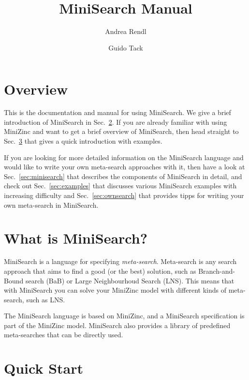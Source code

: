 \documentclass[a4paper,13pt,onecolumn]{article}%
\newcommand{\MiniZinc}{\mbox{\sc MiniZinc}\xspace}
\newcommand{\MiniSearch}{\mbox{\sc MiniSearch}\xspace}
\begin{document}
\title{\MiniSearch Manual}
\author{Andrea Rendl \and Guido Tack}

\maketitle

\tableofcontents

\section{Overview}
This is the documentation and manual for using \MiniSearch. We give
a brief introduction of \MiniSearch in Sec.~\ref{sec:intro}.
If you are already familiar with using \MiniZinc and want to get a brief
overview of \MiniSearch, then head straight to Sec.~\ref{sec:quickStart}
that gives a quick introduction with examples. 

If you are looking for more detailed information on the \MiniSearch
language and would like to write your own meta-search approaches with
it, then have a look at Sec.~\ref{sec:minisearch} that describes the 
components of \MiniSearch in detail, and check out Sec.~\ref{sec:examples}
that discusses various \MiniSearch examples with increasing difficulty and 
Sec.~\ref{sec:ownsearch} that provides tipps for writing your 
own meta-search in \MiniSearch.

\section{What is MiniSearch?}
\label{sec:intro}
\MiniSearch is a language for specifying {\em meta-search}. Meta-search is any
search approach that aims to find a good (or the best) solution,
such as Branch-and-Bound search (BaB) or Large Neighbourhoud 
Search (LNS). This means that with MiniSearch you can solve your 
\MiniZinc model with different kinds of meta-search, such as LNS.

The \MiniSearch language is based on \MiniZinc, and a \MiniSearch
specification is part of the \MiniZinc model. \MiniSearch also provides
a library of predefined meta-searches that can be directly used.

\section{Quick Start}
\label{sec:quickStart}
\end{document}
